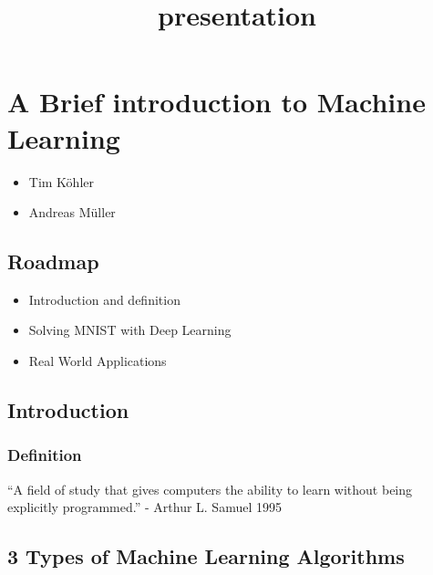 \documentclass[11pt]{article}
\title{presentation}
\providecommand{\tightlist}{%
      \setlength{\itemsep}{0pt}\setlength{\parskip}{0pt}}
\begin{document}
    
    
    \maketitle
    
    

    
    \hypertarget{a-brief-introduction-to-machine-learning}{%
\section{A Brief introduction to Machine
Learning}\label{a-brief-introduction-to-machine-learning}}

    \begin{itemize}
\tightlist
\item
  Tim Köhler
\item
  Andreas Müller
\end{itemize}

    \hypertarget{roadmap}{%
\subsection{Roadmap}\label{roadmap}}

    \begin{itemize}
\tightlist
\item
  Introduction and definition
\item
  Solving MNIST with Deep Learning
\item
  Real World Applications
\end{itemize}

    \hypertarget{introduction}{%
\subsection{Introduction}\label{introduction}}

    

    \hypertarget{definition}{%
\subsubsection{Definition}\label{definition}}

    ``A field of study that gives computers the ability to learn without
being explicitly programmed.'' - Arthur L. Samuel 1995

    \hypertarget{types-of-machine-learning-algorithms}{%
\subsection{3 Types of Machine Learning
Algorithms}\label{types-of-machine-learning-algorithms}}
\end{document}
